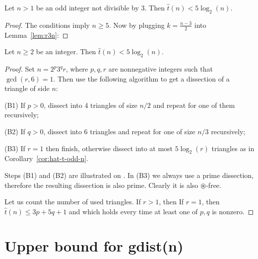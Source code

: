 \begin{cor}
\label{cor:hat-t-odd-n}
Let $n > 1$ be an odd integer not divisible by 3. Then $\hat t(n) < 5\log_2(n)$.
\end{cor}
\begin{proof}
The conditions imply $n \geq 5$. Now by plugging $k = \frac{n-3}{2}$ into Lemma~\ref{lem:r3n}:
\end{proof}


\begin{thm}
\label{thm:t-log-bound}
Let $n \geq 2$ be an integer. Then $\hat t(n) < 5\log_2(n)$.
\end{thm}
\begin{proof}

Set $n = 2^p3^qr$, where $p,q,r$ are nonnegative integers such that $\gcd(r,6) = 1$. Then use the following algorithm to get a dissection of a triangle of side $n$:

\begin{cosyenumerate}
	\item[(B1)] If $p > 0$, dissect into 4 triangles of size $n/2$ and repeat for one of them recursively;
	\item[(B2)] If $q > 0$, dissect into 6 triangles and repeat for one of size $n/3$ recursively;
	\item[(B3)] If $r=1$ then finish, otherwise dissect into at most $5\log_2(r)$ triangles as in Corollary~\ref{cor:hat-t-odd-n}.
\end{cosyenumerate}

Steps (B1) and (B2) are illustrated on . In (B3) we always use a prime dissection, therefore the resulting dissection is also prime. Clearly it is also $\circledast$-free.

Let us count the number of used triangles. If $r > 1$, then
If $r=1$, then $\hat t(n) \leq 3p + 5q + 1$ and
which holds every time at least one of $p,q$ is nonzero.
\end{proof}

\section{Upper bound for gdist(n)}

